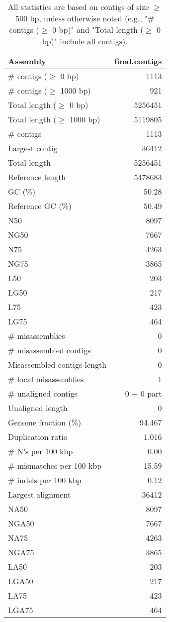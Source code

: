 \documentclass[12pt,a4paper]{article}
\begin{document}
\begin{table}[ht]
\begin{center}
\caption{All statistics are based on contigs of size $\geq$ 500 bp, unless otherwise noted (e.g., "\# contigs ($\geq$ 0 bp)" and "Total length ($\geq$ 0 bp)" include all contigs).}
\begin{tabular}{|l*{1}{|r}|}
\hline
Assembly & final.contigs \\ \hline
\# contigs ($\geq$ 0 bp) & 1113 \\ \hline
\# contigs ($\geq$ 1000 bp) & 921 \\ \hline
Total length ($\geq$ 0 bp) & 5256451 \\ \hline
Total length ($\geq$ 1000 bp) & 5119805 \\ \hline
\# contigs & 1113 \\ \hline
Largest contig & 36412 \\ \hline
Total length & 5256451 \\ \hline
Reference length & 5478683 \\ \hline
GC (\%) & 50.28 \\ \hline
Reference GC (\%) & 50.49 \\ \hline
N50 & 8097 \\ \hline
NG50 & 7667 \\ \hline
N75 & 4263 \\ \hline
NG75 & 3865 \\ \hline
L50 & 203 \\ \hline
LG50 & 217 \\ \hline
L75 & 423 \\ \hline
LG75 & 464 \\ \hline
\# misassemblies & 0 \\ \hline
\# misassembled contigs & 0 \\ \hline
Misassembled contigs length & 0 \\ \hline
\# local misassemblies & 1 \\ \hline
\# unaligned contigs & 0 + 0 part \\ \hline
Unaligned length & 0 \\ \hline
Genome fraction (\%) & 94.467 \\ \hline
Duplication ratio & 1.016 \\ \hline
\# N's per 100 kbp & 0.00 \\ \hline
\# mismatches per 100 kbp & 15.59 \\ \hline
\# indels per 100 kbp & 0.12 \\ \hline
Largest alignment & 36412 \\ \hline
NA50 & 8097 \\ \hline
NGA50 & 7667 \\ \hline
NA75 & 4263 \\ \hline
NGA75 & 3865 \\ \hline
LA50 & 203 \\ \hline
LGA50 & 217 \\ \hline
LA75 & 423 \\ \hline
LGA75 & 464 \\ \hline
\end{tabular}
\end{center}
\end{table}
\end{document}

